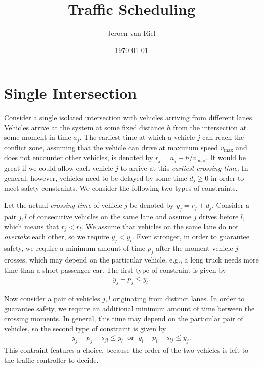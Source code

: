 \documentclass{article}
\title{Traffic Scheduling}
\author{Jeroen van Riel}
\date{\monthyeardate\today}
\theoremstyle{definition}
\theoremstyle{plain}
\begin{document}
\maketitle


\section{Single Intersection}

Consider a single isolated intersection with vehicles arriving from different
lanes. Vehicles arrive at the system at some fixed distance $h$ from the
intersection at some moment in time $a_{j}$. The earliest time at which a
vehicle $j$ can reach the conflict zone, assuming that the vehicle can drive at
maximum speed $v_{\text{max}}$ and does not encounter other vehicles, is denoted
by $r_{j} = a_{j} + h / v_{\text{max}}$. It would be great if we could allow each
vehicle $j$ to arrive at this \textit{earliest crossing time}. In general,
however, vehicles need to be delayed by some time $d_{j} \geq 0$ in order to
meet safety constraints. We consider the following two types of
constraints.

Let the actual \textit{crossing time} of vehicle $j$ be denoted by
$y_{j} = r_{j} + d_{j}$. Consider a pair $j,l$ of consecutive vehicles on the
same lane and assume $j$ drives before $l$, which means that $r_{j} < r_{l}$. We
assume that vehicles on the same lane do not \textit{overtake} each other, so we
require $y_{j} < y_{l}$. Even stronger, in order to guarantee safety, we require
a minimum amount of time $p_{j}$ after the moment vehicle $j$ crosses, which may
depend on the particular vehicle, e.g., a long truck needs more time than a
short passenger car. The first type of constraint is given by
\begin{align}
  \label{eq:traffic-constr-1}
  y_{j} + p_{j} \leq y_{l} .
\end{align}

Now consider a pair of vehicles $j,l$ originating from distinct lanes. In order
to guarantee safety, we require an additional minimum amount of time between the
crossing moments. In general, this time may depend on the particular pair of
vehicles, so the second type of constraint is given by
\begin{align}
  \label{eq:traffic-constr-2}
  y_{j} + p_{j} + s_{jl} \leq y_{l} \; \text{ or } \; y_{l} + p_{l} + s_{lj} \leq y_{j} .
\end{align}
This contraint features a choice, because the order of the two vehicles is left
to the traffic controller to decide.
\end{document}
